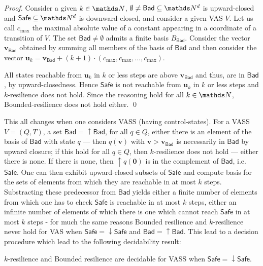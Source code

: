 \documentclass[runningheads]{llncs}
\newcommand{\Bad}{\textsf{Bad}}
\newcommand{\Safe}{\textsf{Safe}}
\begin{document}
\begin{proof}
Consider a given $k \in \N$,
 $\emptyset \neq \Bad \subseteq \N^d$ is upward-closed and $\Safe \subseteq \N^d$ is downward-closed, and
consider a given VAS $V$.
Let us call $c_{\max}$ the maximal absolute value of a constant appearing in a coordinate of a transition of $V$.
The set $\Bad \neq \emptyset$ admits a finite basis $B_\Bad$.
Consider the vector $\textbf{v}_{\Bad}$ obtained by summing all members of the basis of $\Bad$ and then consider the vector
$\textbf{u}_k = \textbf{v}_{\Bad} + (k+1) \cdot (c_{\max}, c_{\max}, \ldots, c_{\max})$.

All states reachable from $\textbf{u}_k$ in $k$ or less steps are above $ \textbf{v}_{\Bad} $
and thus, are in $\Bad$, by upward-closedness.
Hence  $\Safe$ is not reachable from $\textbf{u}_k$ in $k$ or less steps  and {$k$-resilience} does not hold.
Since the reasoning hold for all $k \in \N$, {\sc Bounded-resilience} does not hold either.
\qed
\end{proof}

This all changes when one considers VASS (having control-states). For a VASS $V = (Q,T)$, a set $\Bad = \mathop{\uparrow} \Bad$, for all $q \in Q$, either there is an element of the basis of $\Bad$ with state $q$ \----
then $q(\textbf{v})$ with $\textbf{v} > \textbf{v}_{\Bad}$ is necessarily in $\Bad$ by upward closure; if this hold for all $q \in Q$, then $k$-resilience does not hold \---- either there is none. If there is none, then 
$\mathop{\uparrow} q(\textbf{0})$
 is in the complement of $\Bad$, i.e. $\Safe$. One can then exhibit upward-closed subsets of 
 $\Safe$ and compute basis for the sets of elements from which they are reachable in at most $k$ steps. 
Substracting these predecessor from $\Bad$ yields either a finite number of elements from which one has to check $\Safe$ is reachable in at most $k$ steps, either an infinite number of elements of which there is one which cannot reach $\Safe$ in at most $k$ steps \-- for much the same reasons {\sc Bounded resilience} and {\sc $k$-resilience} never hold for VAS when $\Safe = \mathop{\downarrow} \Safe$ and $\Bad = \mathop{\uparrow} \Bad$. This lead to a decision procedure
 which lead to the following decidability result:
\begin{theorem}
{\sc $k$-resilience }  and {\sc Bounded resilience} are decidable for VASS when 
$\Safe = \mathop{\downarrow} \Safe$.
\end{theorem}
\end{document}
